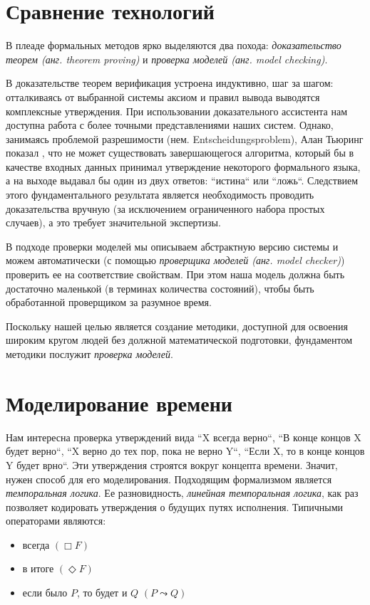 \documentclass[14pt, openany]{report}
\begin{document}
\section{Сравнение технологий}
В плеаде формальных методов ярко выделяются два похода: \emph{доказательство теорем (анг. theorem proving)} и \emph{проверка моделей (анг. model checking)}. 

В доказательстве теорем верификация устроена индуктивно, шаг за шагом: отталкиваясь от выбранной системы аксиом и правил вывода выводятся комплексные утверждения. При использовании доказательного ассистента нам доступна работа с более точными представлениями наших систем. Однако, занимаясь проблемой разрешимости (нем. Entscheidungsproblem), Алан Тьюринг показал \cite{turing}, что не может существовать завершающегося алгоритма, который бы в качестве входных данных принимал утверждение некоторого формального языка, а на выходе выдавал бы один из двух ответов: ``истина`` или ``ложь``. Следствием этого фундаментального результата является необходимость проводить доказательства вручную (за исключением ограниченного набора простых случаев), а это требует значительной экспертизы.

В подходе проверки моделей мы описываем абстрактную версию системы и можем автоматически (с помощью \emph{проверщика моделей (анг. model checker)}) проверить ее на соответствие свойствам. При этом наша модель должна быть достаточно маленькой (в терминах количества состояний), чтобы быть обработанной проверщиком за разумное время.

Поскольку нашей целью является создание методики, доступной для освоения широким кругом людей без должной математической подготовки, фундаментом методики послужит \emph{проверка моделей}.

\section{Моделирование времени}
Нам интересна проверка утверждений вида ``X всегда верно``, ``В конце концов X будет верно``, ``X верно до тех пор, пока не верно Y``, ``Если X, то в конце концов Y будет врно``. Эти утверждения строятся вокруг концепта времени. Значит, нужен способ для его моделирования. Подходящим формализмом является \emph{темпоральная логика}. Ее разновидность, \emph{линейная темпоральная логика}, как раз позволяет кодировать утверждения о будущих путях исполнения. Типичными операторами являются: 


\begin{itemize}
  \item всегда \((\Box F)\)
  \item в итоге \((\Diamond F)\)
  \item если было \(P\), то будет и \(Q\) \((P \leadsto Q)\)
\end{itemize}
\end{document}
